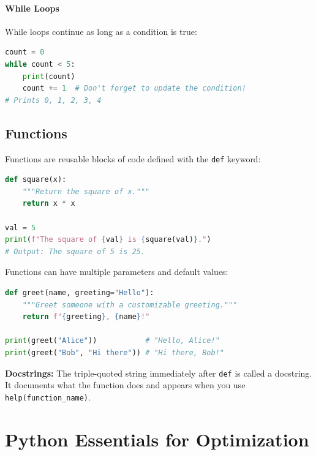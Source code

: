 \paragraph{While Loops}

While loops continue as long as a condition is true:

\begin{lstlisting}[language=Python]
count = 0
while count < 5:
    print(count)
    count += 1  # Don't forget to update the condition!
# Prints 0, 1, 2, 3, 4
\end{lstlisting}

\subsection{Functions}

Functions are reusable blocks of code defined with the \texttt{def} keyword:

\begin{lstlisting}[language=Python]
def square(x):
    """Return the square of x."""
    return x * x

val = 5
print(f"The square of {val} is {square(val)}.")
# Output: The square of 5 is 25.
\end{lstlisting}

Functions can have multiple parameters and default values:

\begin{lstlisting}[language=Python]
def greet(name, greeting="Hello"):
    """Greet someone with a customizable greeting."""
    return f"{greeting}, {name}!"

print(greet("Alice"))           # "Hello, Alice!"
print(greet("Bob", "Hi there")) # "Hi there, Bob!"
\end{lstlisting}

\begin{info}
\textbf{Docstrings:} The triple-quoted string immediately after \texttt{def} is called a docstring. It documents what the function does and appears when you use \texttt{help(function\_name)}.
\end{info}

\section{Python Essentials for Optimization}

